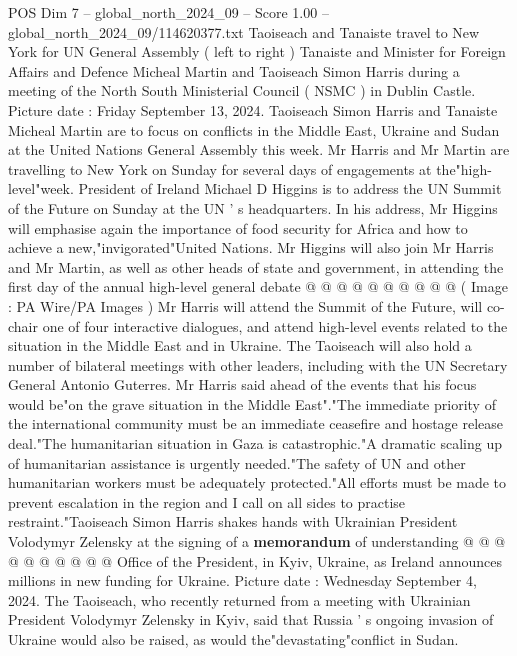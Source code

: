 \begin{textsample}{POS Dim 7 – global\_north\_2024\_09 – Score 1.00 – global\_north\_2024\_09/114620377.txt}  \label{ex:f7_pos_437}
Taoiseach and Tanaiste travel to New York for UN General Assembly ( left to right ) Tanaiste and Minister for Foreign Affairs and Defence Micheal Martin and Taoiseach Simon Harris during a meeting of the North South Ministerial Council ( NSMC ) in Dublin Castle.
Picture date : Friday September 13, 2024.
Taoiseach Simon Harris and Tanaiste Micheal Martin are to focus on conflicts in the Middle East, Ukraine and Sudan at the United Nations General Assembly this week.
Mr Harris and Mr Martin are travelling to New York on Sunday for several days of engagements at the"high-level"week.
President of Ireland Michael D Higgins is to address the UN Summit of the Future on Sunday at the UN ' s headquarters.
In his address, Mr Higgins will emphasise again the importance of food security for Africa and how to achieve a new,"invigorated"United Nations.
Mr Higgins will also join Mr Harris and Mr Martin, as well as other heads of state and government, in attending the first day of the annual high-level general debate @ @ @ @ @ @ @ @ @ @ ( Image : PA Wire/PA Images ) Mr Harris will attend the Summit of the Future, will co-chair one of four interactive dialogues, and attend high-level events related to the situation in the Middle East and in Ukraine.
The Taoiseach will also hold a number of bilateral meetings with other leaders, including with the UN Secretary General Antonio Guterres.
Mr Harris said ahead of the events that his focus would be"on the grave situation in the Middle East"."The immediate priority of the international community must be an immediate ceasefire and hostage release deal."The humanitarian situation in Gaza is catastrophic."A dramatic scaling up of humanitarian assistance is urgently needed."The safety of UN and other humanitarian workers must be adequately protected."All efforts must be made to prevent escalation in the region and I call on all sides to practise restraint."Taoiseach Simon Harris shakes hands with Ukrainian President Volodymyr Zelensky at the signing of a \textbf{memorandum} of understanding @ @ @ @ @ @ @ @ @ @ Office of the President, in Kyiv, Ukraine, as Ireland announces millions in new funding for Ukraine.
Picture date : Wednesday September 4, 2024.
The Taoiseach, who recently returned from a meeting with Ukrainian President Volodymyr Zelensky in Kyiv, said that Russia ' s ongoing invasion of Ukraine would also be raised, as would the"devastating"conflict in Sudan.

\end{textsample}
